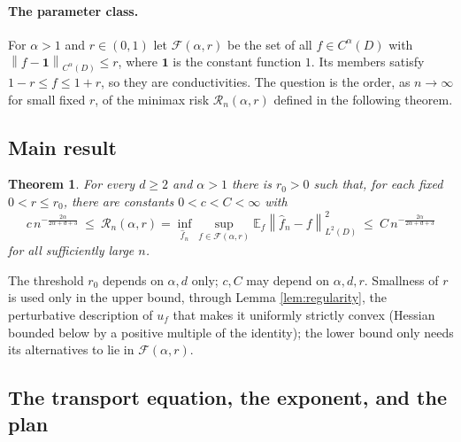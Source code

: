 \documentclass[11pt]{article}
\numberwithin{equation}{section}
\newtheorem{theorem}{Theorem}[section]
\newcommand{\E}{\mathbb E}
\newcommand{\norm}[1]{\left\|#1\right\|}
\begin{document}
\paragraph{The parameter class.}
For $\alpha>1$ and $r\in(0,1)$ let $\mathcal F(\alpha,r)$ be the set
of all $f\in C^\alpha(D)$ with $\norm{f-\mathbf 1}_{C^\alpha(D)}\le r$,
where $\mathbf 1$ is the constant function $1$. Its members satisfy
$1-r\le f\le1+r$, so they are conductivities. The question is the order,
as $n\to\infty$ for small fixed $r$, of the minimax risk
$\mathcal R_n(\alpha,r)$ defined in the following theorem.

\subsection{Main result}

\begin{theorem}\label{thm:main}
For every $d\ge2$ and $\alpha>1$ there is $r_0>0$ such that, for each
fixed $0<r\le r_0$, there are constants $0<c<C<\infty$ with
\[
 c\,n^{-\frac{2\alpha}{2\alpha+d+3}}
 \ \le\
 \mathcal R_n(\alpha,r)
 =\inf_{\widehat f_n}\sup_{f\in\mathcal F(\alpha,r)}
 \E_f\norm{\widehat f_n-f}_{L^2(D)}^2
 \ \le\
 C\,n^{-\frac{2\alpha}{2\alpha+d+3}}
\]
for all sufficiently large $n$.
\end{theorem}

The threshold $r_0$ depends on $\alpha,d$ only; $c,C$ may depend on
$\alpha,d,r$. Smallness of $r$ is used only in the
upper bound, through Lemma \ref{lem:regularity}, the perturbative
description of $u_f$ that makes it uniformly strictly convex (Hessian
bounded below by a positive multiple of the identity); the lower bound
only needs its alternatives to lie in $\mathcal F(\alpha,r)$.

\subsection{The transport equation, the exponent, and the plan}\label{sec:heuristic}
\end{document}
